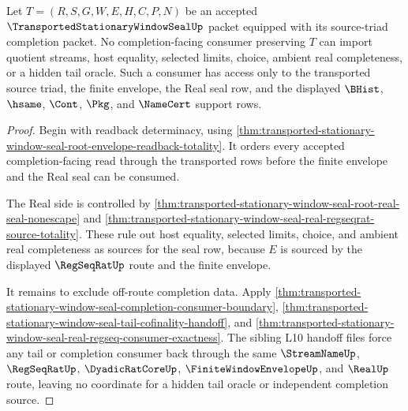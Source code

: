 \begin{theorem}
\label{thm:transported-stationary-window-seal-completion-route-nonescape}
Let $T=(R,S,G,W,E,H,C,P,N)$ be an accepted $\TransportedStationaryWindowSealUp$ packet equipped with its source-triad completion packet. No completion-facing consumer preserving $T$ can import quotient streams, host equality, selected limits, choice, ambient real completeness, or a hidden tail oracle. Such a consumer has access only to the transported source triad, the finite envelope, the Real seal row, and the displayed $\BHist$, $\hsame$, $\Cont$, $\Pkg$, and $\NameCert$ support rows.
\end{theorem}
\begin{proof}
Begin with readback determinacy, using \autoref{thm:transported-stationary-window-seal-root-envelope-readback-totality}. It orders every accepted completion-facing read through the transported rows before the finite envelope and the Real seal can be consumed.

The Real side is controlled by \autoref{thm:transported-stationary-window-seal-root-real-seal-nonescape} and \autoref{thm:transported-stationary-window-seal-real-regseqrat-source-totality}. These rule out host equality, selected limits, choice, and ambient real completeness as sources for the seal row, because $E$ is sourced by the displayed $\RegSeqRatUp$ route and the finite envelope.

It remains to exclude off-route completion data. Apply \autoref{thm:transported-stationary-window-seal-completion-consumer-boundary}, \autoref{thm:transported-stationary-window-seal-tail-cofinality-handoff}, and \autoref{thm:transported-stationary-window-seal-real-regseq-consumer-exactness}. The sibling L10 handoff files force any tail or completion consumer back through the same $\StreamNameUp$, $\RegSeqRatUp$, $\DyadicRatCoreUp$, $\FiniteWindowEnvelopeUp$, and $\RealUp$ route, leaving no coordinate for a hidden tail oracle or independent completion source.
\end{proof}
